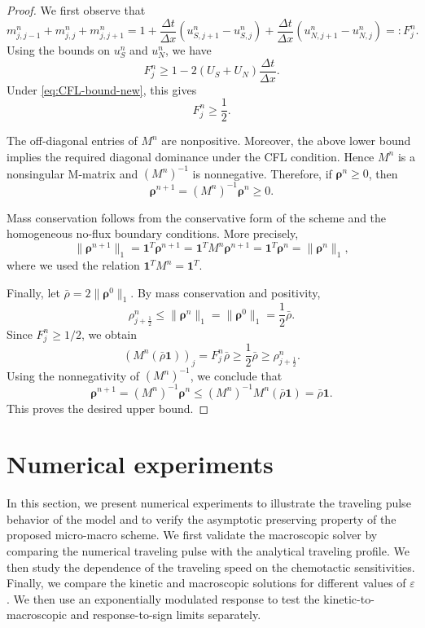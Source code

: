 \documentclass[11pt,twoside]{article}
\numberwithin{equation}{section}
\theoremstyle{plain}
\theoremstyle{nonumberplain}
\newtheorem{proof}{Proof.-}
\newcommand{\brho}{\boldsymbol{\rho}}
\newif\ifrevisionred
\DeclareRobustCommand{\st}[1]{{\ifrevisionred\color{red}\fi #1}}
\begin{document}
{\begin{proof}{\rm
We first observe that
\[
m_{j,j-1}^n+m_{j,j}^n+m_{j,j+1}^n
=
1+\frac{\Delta t}{\Delta x}
\left(u_{S,j+1}^n-u_{S,j}^n\right)
+\frac{\Delta t}{\Delta x}
\left(u_{N,j+1}^n-u_{N,j}^n\right)
=:F_j^n .
\]
Using the bounds on $u_S^n$ and $u_N^n$, we have
\[
F_j^n
\ge
1-2(U_S+U_N)\frac{\Delta t}{\Delta x}.
\]
Under \eqref{eq:CFL-bound-new}, this gives
\[
F_j^n\ge \frac12 .
\]

The off-diagonal entries of $M^n$ are nonpositive. Moreover, the above
lower bound implies the required diagonal dominance under the CFL
condition. Hence $M^n$ is a nonsingular M-matrix and $(M^n)^{-1}$ is
nonnegative. Therefore, if $\brho^n\ge0$, then
\[
\brho^{n+1}=(M^n)^{-1}\brho^n\ge0.
\]

Mass conservation follows from the conservative form of the scheme and the
homogeneous no-flux boundary conditions.  More precisely, 
\[
\|\brho^{n+1}\|_1
=
\mathbf 1^T\brho^{n+1}
=
\mathbf 1^T M^n\brho^{n+1}
=
\mathbf 1^T\brho^n
=
\|\brho^n\|_1 ,
\]
where we used the relation
\(
\mathbf 1^T M^n=\mathbf 1^T .
\)

Finally, let $\bar\rho=2\|\brho^0\|_1$. By mass conservation and
positivity,
\[
\rho_{j+\frac12}^n\le \|\brho^n\|_1=\|\brho^0\|_1=\frac12\bar\rho .
\]
Since $F_j^n\ge1/2$, we obtain
\[
(M^n(\bar\rho\mathbf 1))_j
=
F_j^n\bar\rho
\ge
\frac12\bar\rho
\ge
\rho_{j+\frac12}^n .
\]
Using the nonnegativity of $(M^n)^{-1}$, we conclude that
\[
\brho^{n+1}
=
(M^n)^{-1}\brho^n
\le
(M^n)^{-1}M^n(\bar\rho\mathbf 1)
=
\bar\rho\mathbf 1 .
\]
This proves the desired upper bound. }
\end{proof}



\section{Numerical experiments}\label{sec: numerics}

In this section, we present numerical experiments to illustrate the
traveling pulse behavior of the model and to verify the asymptotic
preserving property of the proposed micro-macro scheme. We first validate
the macroscopic solver by comparing the numerical traveling pulse with
the analytical traveling profile. We then study the dependence of the
traveling speed on the chemotactic sensitivities. Finally, we compare
the kinetic and macroscopic solutions for different values of
\(\varepsilon\). \st{We then use an exponentially modulated response to test the kinetic-to-macroscopic and response-to-sign limits separately.}


}
\end{document}
